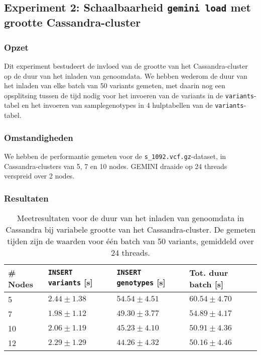   
\subsection{Experiment 2: Schaalbaarheid \texttt{gemini load} met grootte Cassandra-cluster}
\label{exp2}

\subsubsection{Opzet}

Dit experiment bestudeert de invloed van de grootte van het Cassandra-cluster op de duur van het inladen van genoomdata. We hebben wederom de duur van het inladen van elke batch van 50 variants gemeten, met daarin nog een opsplitsing tussen de tijd nodig voor het invoeren van de variants in de \texttt{variants}-tabel en het invoeren van samplegenotypes in 4 hulptabellen van de \texttt{variants}-tabel.

\subsubsection{Omstandigheden}

We hebben de performantie gemeten voor de \texttt{s\_1092.vcf.gz}-dataset, in Cassandra-clusters van 5, 7 en 10 nodes. GEMINI draaide op 24 threads verspreid over 2 nodes.

\subsubsection{Resultaten}

\begin{table}[h]
\centering

\begin{tabular}{@{}llll@{}}
\cmidrule(l){1-4}
\multicolumn{1}{|l|}{\textbf{\# Nodes}}  & \multicolumn{1}{l|}{\textbf{\texttt{INSERT variants} [s]}} & \multicolumn{1}{l|}{\textbf{\texttt{INSERT genotypes} [s]}} & \multicolumn{1}{l|}{\textbf{Tot. duur batch [s]}}             \\ \midrule
\multicolumn{1}{|l|}{5} & \multicolumn{1}{l|}{$2.44 \pm 1.38$} & \multicolumn{1}{l|}{$54.54 \pm 4.51$}   & \multicolumn{1}{l|}{$60.54 \pm 4.70$}\\
\multicolumn{1}{|l|}{7} & \multicolumn{1}{l|}{$1.98 \pm 1.12$} & \multicolumn{1}{l|}{$49.30 \pm 3.77$}     &  \multicolumn{1}{l|}{$54.89 \pm 4.17$}  \\
\multicolumn{1}{|l|}{10} & \multicolumn{1}{l|}{$2.06 \pm 1.19$} & \multicolumn{1}{l|}{$45.23 \pm 4.10$}     &  \multicolumn{1}{l|}{$50.91 \pm 4.36$}  \\
\multicolumn{1}{|l|}{12} & \multicolumn{1}{l|}{$2.29 \pm 1.29$} &\multicolumn{1}{l|}{$44.26 \pm 4.32$}     &  \multicolumn{1}{l|}{$50.16 \pm 4.46$}  \\
\bottomrule
\end{tabular}
\caption{Meetresultaten voor de duur van het inladen van genoomdata in Cassandra bij variabele grootte van het Cassandra-cluster. De gemeten tijden zijn de waarden voor \'e\'en batch van 50 variants, gemiddeld over 24 threads.}
\end{table}

